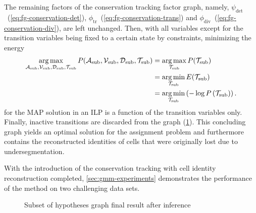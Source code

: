 The remaining factors of the conservation tracking factor graph, namely,
$\psi_{\text{det}}$~(\cref{eq:fg-conservation-det}),
$\phi_{\text{tr}}$~(\cref{eq:fg-conservation-trans}) and
$\phi_{\text{div}}$~(\cref{eq:fg-conservation-div}), are left unchanged. Then, with all variables
except for the transition variables being fixed to a certain state by constraints, minimizing the energy
\begin{align} \operatorname*{arg\,max}_{\mathcal{A}_{\text{sub}}, \mathcal{V}_{\text{sub}},
        \mathcal{D}_{\text{sub}}, \mathcal{T}_{\text{sub}}}P(\mathcal{A}_{\text{sub}},
    \mathcal{V}_{\text{sub}},
    \mathcal{D}_{\text{sub}}, \mathcal{T}_{\text{sub}})  &= \operatorname*{arg\,max}_{\mathcal{T}_{\text{sub}}} P(\mathcal{T}_{\text{sub}})\\
    &=\operatorname*{arg\,min}_{\mathcal{T}_{\text{sub}}} E(\mathcal{T}_{\text{sub}}) \\
    &=\operatorname*{arg\,min}_{\mathcal{T}_{\text{sub}}}\left(-\log P\left(\mathcal{T}_{\text{sub}}\right)\right).
    \label{eq:fg-conservation-map-resolve}
\end{align}
for the MAP solution in an ILP is a function of the transition variables only. Finally, inactive
transitions are discarded from the graph
(\cref{fig:gmm-hypotheses-graph-subset-after-inference}). This concluding graph yields an optimal
solution for the assignment problem and furthermore contains the reconstructed identities of cells
that were originally lost due to undersegmentation.

With the introduction of the conservation tracking with cell identity reconstruction completed,
\cref{sec:gmm-experiments} demonstrates the performance of the method on two challenging data sets.

\begin{figure}
    \centering
    \scalebox{0.7}{
        \begin{tikzpicture}[minimum size=58pt,scale=0.45, every node/.style={scale=0.45, text=black, font=\LARGE}, thick]
            
        \end{tikzpicture}
    }
    \caption{Subset of hypotheses graph final result after inference }
    \label{fig:gmm-hypotheses-graph-subset-after-inference}
\end{figure}



